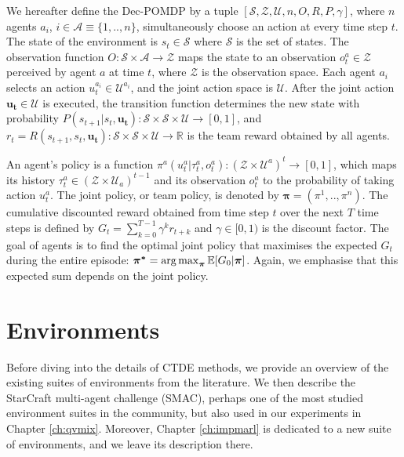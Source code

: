 We hereafter define the Dec-POMDP by a tuple $[\mathcal{S}, \mathcal{Z}, \mathcal{U}, n, O, R, P, \gamma]$, where $n$ agents $a_i$, $i \in \mathcal{A} \equiv \{1,..,n\}$, simultaneously choose an action at every time step $t$.
The state of the environment is $s_t \in \mathcal{S}$ where $\mathcal{S}$ is the set of states.
The observation function $O: \mathcal{S} \times \mathcal{A} \rightarrow \mathcal{Z}$ maps the state to an observation $o_t^{a} \in \mathcal{Z}$ perceived by agent $a$ at time $t$, where $\mathcal{Z}$ is the observation space.
Each agent $a_i$ selects an action $u_t^{a_i} \in \mathcal{U}^{a_i}$, and the joint action space is $\mathcal{U}$.
After the joint action $\boldsymbol{u_t} \in \mathcal{U}$ is executed, the transition function determines the new state with probability $P(s_{t+1}|s_t, \boldsymbol{u_t}): \mathcal{S} \times \mathcal{S} \times\mathcal{U} \rightarrow  [0,1] $, and $r_t=R(s_{t+1}, s_t, \boldsymbol {u_t}): \mathcal{S} \times \mathcal{S} \times \mathcal{U} \rightarrow \mathbb{R}$ is the team reward obtained by all agents.

An agent's policy is a function $\pi^{a}(u_t^{a}|\tau_t^{a},o_t^{a}): (\mathcal{Z} \times \mathcal{U}^a)^t \rightarrow [0,1]$, which maps its history $\tau_t^{a} \in (\mathcal{Z} \times \mathcal{U}_a)^{t-1}$ and its observation $o_t^{a}$ to the probability of taking action $u_t^{a}$. 
The joint policy, or team policy, is denoted by $\boldsymbol{\pi}=(\pi^1,..,\pi^n)$.
The cumulative discounted reward obtained from time step $t$ over the next $T$ time steps is defined by $G_{t} = \sum_{k=0}^{T-1} \gamma^k r_{t+k}$ and $\gamma \in [0, 1)$ is the discount factor.
The goal of agents is to find the optimal joint policy that maximises the expected $G_t$ during the entire episode: $\boldsymbol{\pi^{*}} =\operatorname*{arg\,max}_{\boldsymbol{\pi}} \mathbb{E}[G_0|\boldsymbol{\pi}]$.
Again, we emphasise that this expected sum depends on the joint policy.





\section{Environments}
\label{sec:ch3_env}
Before diving into the details of CTDE methods, we provide an overview of the existing suites of environments from the literature.
We then describe the StarCraft multi-agent challenge (SMAC), perhaps one of the most studied environment suites in the community, but also used in our experiments in Chapter \ref{ch:qvmix}.
Moreover, Chapter \ref{ch:impmarl} is dedicated to a new suite of environments, and we leave its description there.

